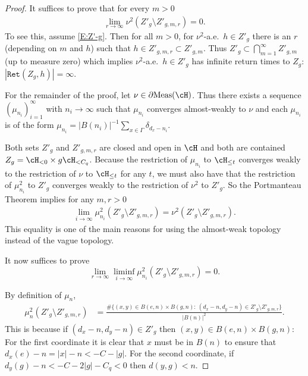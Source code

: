 \documentclass[12pt]{article}
\theoremstyle{plain}
\theoremstyle{definition}
\theoremstyle{remark}
\newcommand{\G}{\Gamma}
\newcommand\Meas{{\operatorname{Meas}}}
\newcommand\Ret{\mathtt{Ret}}
\begin{document}
\begin{proof}
It suffices to prove that for every $m>0$ %
\begin{align}\label{E:Z'-g}
 \lim_{r\to\infty}   \nu^2(Z'_g \setminus Z'_{g,m,r})=0.
\end{align}
To see this, assume \eqref{E:Z'-g}. Then for all $m>0$, for $\nu^2$-a.e.\ $h \in Z'_g$ there is an $r$ (depending on $m$ and $h$) such that $h\in Z'_{g,m,r} \subset Z'_{g,m}$. Thus $Z'_g \subset \bigcap_{m=1}^\infty  Z'_{g,m}$ (up to measure zero) which implies $\nu^2$-a.e.\ $h\in Z'_g$ has 
infinite return times to $Z_g$: $|\Ret(Z_g, h)|=\infty$.



For the remainder of the proof, let $\nu \in \partial\Meas(\cH)$. Thus there exists a sequence $(\mu_{n_i})_{i=1}^\infty$ with $n_i\to\infty$ such that $\mu_{n_i}$ converges almost-weakly to $\nu$ and each $\mu_{n_i}$ is of the form $\mu_{n_i}=|B(n_i)|^{-1}\sum_{x\in\G} \delta_{d_x-n_i}$.

Both sets $Z'_g$ and $Z'_{g,m,r}$ are closed and open in $\cH$ and both are contained $Z_g = \cH_{<0} \times g\cH_{<C_q}$. Because the restriction of $\mu_{n_i}$ to $\cH_{\le t}$ converges weakly to the restriction of $\nu$ to $\cH_{\le t}$ for any $t$, we must also have that the restriction of $\mu^2_{n_i}$ to $Z'_g$ converges weakly to the restriction of $\nu^2$ to $Z'_g$.   So the Portmanteau Theorem implies for any $m,r>0$
\begin{align}
 \lim_{i\to\infty}  \mu^2_{n_i}(Z'_g \setminus Z'_{g,m,r})= \nu^2(Z'_g \setminus Z'_{g,m,r}).
\end{align}
This equality is one of the main reasons for using the almost-weak topology instead of the vague topology. 

It now suffices to prove 
$$\lim_{r\to\infty} \liminf_{i\to\infty}  \mu^2_{n_i}(Z'_g \setminus Z'_{g,m,r}) = 0.$$

By definition of $\mu_{n}$, 
\begin{align*}
\mu^2_n(  Z'_g \setminus Z'_{g,m,r}) &= \frac{\#\{(x,y) \in B(e,n)\times B(g,n):~(d_x-n,d_y-n) \in Z'_g \setminus Z'_{g,m,r}\}}{|B(n)|^2}.
\end{align*}
This is because if $(d_x-n,d_y-n) \in Z'_g$ then $(x,y) \in B(e,n)\times B(g,n)$:
For the first coordinate it is clear that $x$ must be in $B(n)$ to ensure that $d_x(e)-n = |x| - n<-C-|g|$. 
For the second coordinate, if $d_y(g)-n<-C-2|g|-C_q<0$ then $d(y,g)<n$.


\end{proof}
\end{document}

